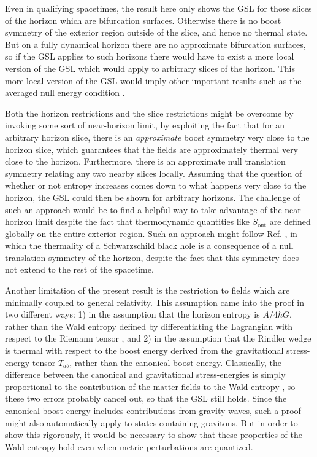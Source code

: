 \documentclass{article}
\begin{document}
Even in qualifying spacetimes, the result here only shows the GSL for those slices of the horizon which are bifurcation surfaces.  Otherwise there is no boost symmetry of the exterior region outside of the slice, and hence no thermal state.  But on a fully dynamical horizon there are no approximate bifurcation surfaces, so if the GSL applies to such horizons there would have to exist a more local version of the GSL which would apply to arbitrary slices of the horizon.  This more local version of the GSL would imply other important results such as the averaged null energy condition \cite{anec}.

Both the horizon restrictions and the slice restrictions might be overcome by invoking some sort of near-horizon limit, by exploiting the fact that for an arbitrary horizon slice, there is an \emph{approximate} boost symmetry very close to the horizon slice, which guarantees that the fields are approximately thermal very close to the horizon.  Furthermore, there is an approximate null translation symmetry relating any two nearby slices locally.  Assuming that the question of whether or not entropy increases comes down to what happens very close to the horizon, the GSL could then be shown for arbitrary horizons.  The challenge of such an approach would be to find a helpful way to take advantage of the near-horizon limit despite the fact that thermodynamic quantities like $S_\mathrm{out}$ are defined globally on the entire exterior region.  Such an approach might follow Ref. \cite{sewell81}, in which the thermality of a Schwarzschild black hole is a consequence of a null translation symmetry of the horizon, despite the fact that this symmetry does not extend to the rest of the spacetime.

Another limitation of the present result is the restriction to fields which are minimally coupled to general relativity.  This assumption came into the proof in two different ways:  
1) in the assumption that the horizon entropy is $A/{4\hbar G}$, rather than the Wald entropy defined by differentiating the Lagrangian with respect to the Riemann tensor \cite{WI94}, and 2) in the assumption that the Rindler wedge is thermal with respect to the boost energy derived from the gravitational stress-energy tensor $T_{ab}$, rather than the canonical boost energy.  Classically, the difference between the canonical and gravitational stress-energies is simply proportional to the contribution of the matter fields to the Wald entropy \cite{fursaev99}, so these two errors probably cancel out, so that the GSL still holds.  Since the canonical boost energy includes contributions from gravity waves, such a proof might also automatically apply to states containing gravitons.  But in order to show this rigorously, it would be necessary to show that these properties of the Wald entropy hold even when metric perturbations are quantized.
\end{document}
